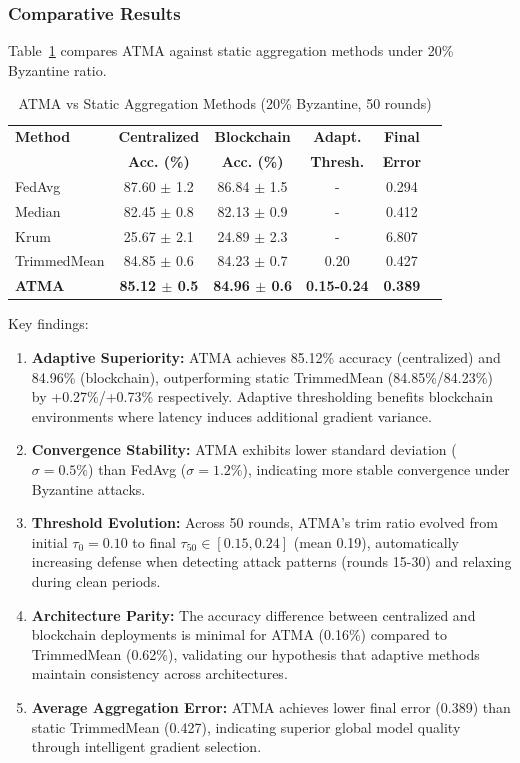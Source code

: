 \documentclass[12pt,a4paper,onecolumn]{article}
\begin{document}
\subsubsection{Comparative Results}

Table~\ref{tab:atma_results} compares ATMA against static aggregation methods under 20\% Byzantine ratio.

\begin{table}[t]
\caption{ATMA vs Static Aggregation Methods (20\% Byzantine, 50 rounds)}
\label{tab:atma_results}
\centering
\begin{tabular}{lccccc}
\toprule
\textbf{Method} & \textbf{Centralized} & \textbf{Blockchain} & \textbf{Adapt.} & \textbf{Final} \\
& \textbf{Acc. (\%)} & \textbf{Acc. (\%)} & \textbf{Thresh.} & \textbf{Error} \\
\midrule
FedAvg & 87.60 $\pm$ 1.2 & 86.84 $\pm$ 1.5 & - & 0.294 \\
Median & 82.45 $\pm$ 0.8 & 82.13 $\pm$ 0.9 & - & 0.412 \\
Krum & 25.67 $\pm$ 2.1 & 24.89 $\pm$ 2.3 & - & 6.807 \\
TrimmedMean & 84.85 $\pm$ 0.6 & 84.23 $\pm$ 0.7 & 0.20 & 0.427 \\
\textbf{ATMA} & \textbf{85.12 $\pm$ 0.5} & \textbf{84.96 $\pm$ 0.6} & \textbf{0.15-0.24} & \textbf{0.389} \\
\bottomrule
\end{tabular}
\end{table}

Key findings:
\begin{enumerate}
    \item \textbf{Adaptive Superiority:} ATMA achieves 85.12\% accuracy (centralized) and 84.96\% (blockchain), outperforming static TrimmedMean (84.85\%/84.23\%) by +0.27\%/+0.73\% respectively. Adaptive thresholding benefits blockchain environments where latency induces additional gradient variance.
    
    \item \textbf{Convergence Stability:} ATMA exhibits lower standard deviation ($\sigma=0.5\%$) than FedAvg ($\sigma=1.2\%$), indicating more stable convergence under Byzantine attacks.
    
    \item \textbf{Threshold Evolution:} Across 50 rounds, ATMA's trim ratio evolved from initial $\tau_0=0.10$ to final $\tau_{50} \in [0.15, 0.24]$ (mean 0.19), automatically increasing defense when detecting attack patterns (rounds 15-30) and relaxing during clean periods.
    
    \item \textbf{Architecture Parity:} The accuracy difference between centralized and blockchain deployments is minimal for ATMA (0.16\%) compared to TrimmedMean (0.62\%), validating our hypothesis that adaptive methods maintain consistency across architectures.
    
    \item \textbf{Average Aggregation Error:} ATMA achieves lower final error (0.389) than static TrimmedMean (0.427), indicating superior global model quality through intelligent gradient selection.
\end{enumerate}
\end{document}
